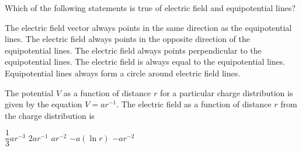 \documentclass{../../oss-classkick-exam}
\begin{document}
\begin{questions}
  \question Which of the following statements is true of electric field and
  equipotential lines?
  \begin{choices}
    \choice The electric field vector always points in the same direction as
    the equipotential lines.
    \choice The electric field always points in the opposite direction of the
    equipotential lines.
    \choice The electric field always points perpendicular to the equipotential
    lines.
    \choice The electric field is always equal to the equipotential lines.
    \choice Equipotential lines always form a circle around electric field
    lines.
  \end{choices}
  \vspace{.7in}
   
  \question The potential $V$ as a function of distance $r$ for a particular
  charge distribution is given by the equation $V=ar^{-1}$. The electric field
  as a function of distance $r$ from the charge distribution is
  \begin{choices}
    \choice $\dfrac13ar^{-3}$
    \choice $2ar^{-1}$
    \choice $ar^{-2}$
    \choice $-a(\ln r)$
    \choice $-ar^{-2}$
  \end{choices}
   
\end{questions}
\newpage


\genfreedirections
\end{document}
